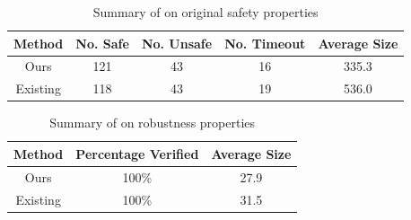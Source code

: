 

\begin{table}
    \vspace*{-0.25cm}
    \centering
        \begin{tabular}{ |c|c|c|c|c| }
        \hline
        Method                   & No. Safe    & No. Unsafe & No. Timeout & Average Size \\ 
        \hline
        Ours                     &   121       & 43         & 16          &  335.3\\
        Existing \cite{cegar-nn} &   118       & 43         & 19          &  536.0\\
        \hline                                                                
        \end{tabular}
        \caption{Summary of \acasxu on original safety properties }
        \label{t:acas-verif}
    \vspace{-1.5cm}
\end{table}
\begin{table}
    \centering
    \begin{tabular}{ |c|c|c| }
    \hline
    Method                   & Percentage Verified  & Average Size \\ 
    \hline
    Ours                     &   100\%              &  27.9\\
    Existing \cite{cegar-nn} &   100\%              &  31.5\\
    \hline                                                                
    \end{tabular}
    \caption{Summary of \acasxu on robustness properties }
    \label{t:acas-verif-robustness}
    \vspace*{-0.75cm}
\end{table}


